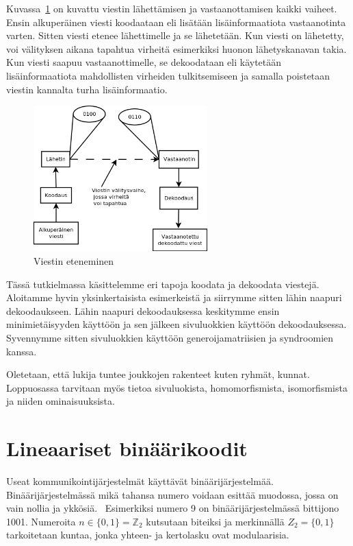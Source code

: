 \documentclass[a4paper,12pt,leqno,oneside]{report} %
\theoremstyle{plain}
\theoremstyle{plain}
\theoremstyle{definition}
\theoremstyle{remark}
\numberwithin{equation}{chapter}
\newcommand*{\Zset}{\mathbb{Z}}  %
\begin{document}
    Kuvassa~\ref{kuva:lahetys} on kuvattu viestin lähettämisen ja vastaanottamisen kaikki vaiheet. Ensin alkuperäinen viesti koodaataan eli lisätään lisäinformaatiota vastaanotinta varten. Sitten viesti etenee lähettimelle ja se lähetetään. Kun viesti on lähetetty, voi välityksen aikana tapahtua virheitä esimerkiksi huonon lähetyskanavan takia. Kun viesti saapuu vastaanottimelle, se dekoodataan eli käytetään lisäinformaatiota mahdollisten virheiden tulkitsemiseen ja samalla poistetaan viestin kannalta turha lisäinformaatio. 
    \begin{figure}
        \centering
        \includegraphics[width=0.6\textwidth]{lahetys}
        \caption{Viestin eteneminen}\label{kuva:lahetys}
    \end{figure}

    Tässä tutkielmassa käsittelemme eri tapoja koodata ja dekoodata viestejä.  Aloitamme hyvin yksinkertaisista esimerkeistä ja siirrymme sitten lähin naapuri dekoodaukseen. Lähin naapuri dekoodauksessa keskitymme ensin minimietäisyyden käyttöön ja sen jälkeen sivuluokkien käyttöön dekoodauksessa. Syvennymme sitten sivuluokkien käyttöön generoijamatriisien ja syndroomien kanssa. 

    Oletetaan, että lukija tuntee joukkojen rakenteet kuten ryhmät, kunnat. Loppu\-osassa tarvitaan myös tietoa sivuluokista, homomorfismista, isomorfismista ja niiden ominaisuuksista.

    \chapter{Lineaariset binäärikoodit}\label{ch: Lineaariset binäärikoodit}

    Useat kommunikointijärjestelmät käyttävät binäärijärjestelmää. Binäärijärjestelmässä mikä tahansa numero voidaan esittää muodossa, jossa on vain nollia ja ykkösiä.~\cite[s.~266]{GW} Esimerkiksi numero 9 on binäärijärjestelmässä bittijono 1001. Numeroita $n \in \{ 0, 1 \} = \Zset_2$ kutsutaan biteiksi ja merkinnällä $Z_2 = \{ 0, 1 \}$ tarkoitetaan kuntaa, jonka yhteen- ja kertolasku ovat modulaarisia.
\end{document}
